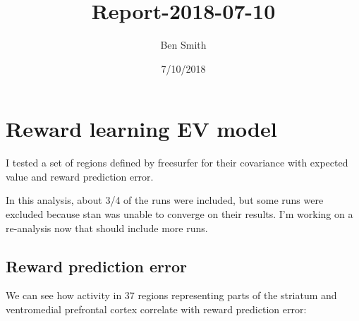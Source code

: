 \documentclass[]{article}
\title{Report-2018-07-10}
\author{Ben Smith}
\date{7/10/2018}
\begin{document}
\maketitle

\section{Reward learning EV model}\label{reward-learning-ev-model}

I tested a set of regions defined by freesurfer for their covariance
with expected value and reward prediction error.

In this analysis, about 3/4 of the runs were included, but some runs
were excluded because stan was unable to converge on their results. I'm
working on a re-analysis now that should include more runs.

\subsection{Reward prediction error}\label{reward-prediction-error}

We can see how activity in 37 regions representing parts of the striatum
and ventromedial prefrontal cortex correlate with reward prediction
error:
\end{document}
